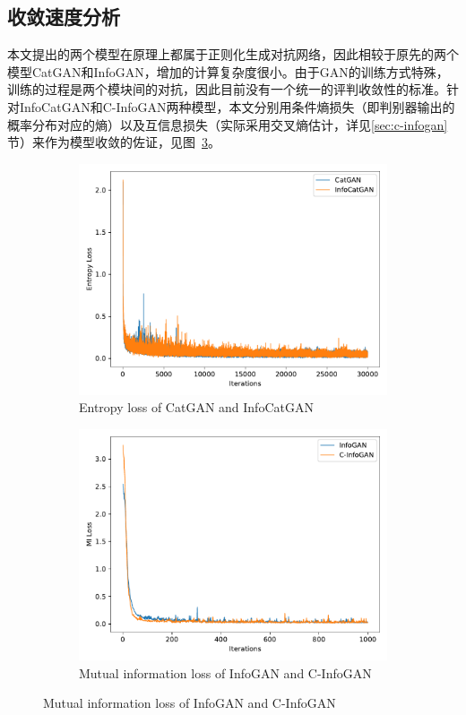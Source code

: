\subsection{收敛速度分析}
本文提出的两个模型在原理上都属于正则化生成对抗网络，因此相较于原先的两个模型CatGAN和InfoGAN，增加的计算复杂度很小。由于GAN的训练方式特殊，训练的过程是两个模块间的对抗，因此目前没有一个统一的评判收敛性的标准。针对InfoCatGAN和C-InfoGAN两种模型，本文分别用条件熵损失（即判别器输出的概率分布对应的熵）以及互信息损失（实际采用交叉熵估计，详见\ref{sec:c-infogan}节）来作为模型收敛的佐证，见图~\ref{fig:convergence}。
\begin{figure}[htbp]
  \centering
  \begin{subfigure}[b]{\twof\textwidth}
    \includegraphics[width=\textwidth]{Img/icg-convergence.pdf}
    \caption{Entropy loss of CatGAN and InfoCatGAN}
    \label{ffig:icg-convergence}
  \end{subfigure}
  \begin{subfigure}[b]{\twof\textwidth}
    \includegraphics[width=\textwidth]{Img/cig-convergence.pdf}
    \caption{Mutual information loss of InfoGAN and C-InfoGAN}
    \label{ffig:cig-convergence}
  \end{subfigure}
  \label{fig:convergence}
\end{figure}

